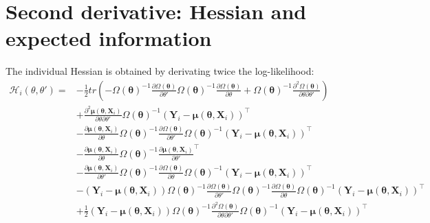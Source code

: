 \documentclass[table]{article}
\newcommand{\VX}{\boldsymbol{X}}
\newcommand{\VY}{\boldsymbol{Y}}
\newcommand{\Vmu}{\boldsymbol{\mu}}
\newcommand{\param}{\theta}
\newcommand{\Vparam}{\boldsymbol{\param}}
\newcommand\Hessian{\mathcal{H}}
\newcommand\dpartial[2]{\frac{\partial #1}{\partial #2}}
\newcommand\trans[1]{{#1}^\intercal}%
\begin{document}
\section{Second derivative: Hessian and expected information}
\label{SM:Information}
The individual Hessian is obtained by derivating twice the
log-likelihood:
\begin{align*}
   \Hessian_i(\param,\param') =& -\frac{1}{2} tr\left(-\Omega(\Vparam)^{-1} \dpartial{\Omega(\Vparam)}{\param'} \Omega(\Vparam)^{-1} \frac{\partial \Omega(\Vparam)}{\partial \param} + \Omega(\Vparam)^{-1} \frac{\partial^2 \Omega(\Vparam)}{\partial \param \partial \param'}\right) \\
 &+  \frac{\partial^2 \Vmu(\Vparam,\VX_i)}{\partial \param \partial \param'} \Omega(\Vparam)^{-1} \trans{(\VY_i-\Vmu(\Vparam,\VX_i))} \\
 &-  \dpartial{\Vmu(\Vparam,\VX_i)}{\param} \Omega(\Vparam)^{-1} \dpartial{\Omega(\Vparam)}{\param'} \Omega(\Vparam)^{-1} \trans{(\VY_i-\Vmu(\Vparam,\VX_i))} \\
 &-  \dpartial{\Vmu(\Vparam,\VX_i)}{\param} \Omega(\Vparam)^{-1} \trans{\dpartial{\Vmu(\Vparam,\VX_i)}{\param'}} \\
 &-  \dpartial{\Vmu(\Vparam,\VX_i)}{\param'} \Omega(\Vparam)^{-1} \dpartial{\Omega(\Vparam)}{\param} \Omega(\Vparam)^{-1} \trans{(\VY_i-\Vmu(\Vparam,\VX_i))}  \\
 &-  (\VY_i-\Vmu(\Vparam,\VX_i)) \Omega(\Vparam)^{-1} \dpartial{\Omega(\Vparam)}{\param'} \Omega(\Vparam)^{-1} \frac{\partial \Omega(\Vparam)}{\partial \param} \Omega(\Vparam)^{-1} \trans{(\VY_i-\Vmu(\Vparam,\VX_i))} \\
 &+ \frac{1}{2} (\VY_i-\Vmu(\Vparam,\VX_i)) \Omega(\Vparam)^{-1} \frac{\partial^2 \Omega(\Vparam)}{\partial \param \partial \param'} \Omega(\Vparam)^{-1} \trans{(\VY_i-\Vmu(\Vparam,\VX_i))} \\
\end{align*}

\clearpage
\end{document}
